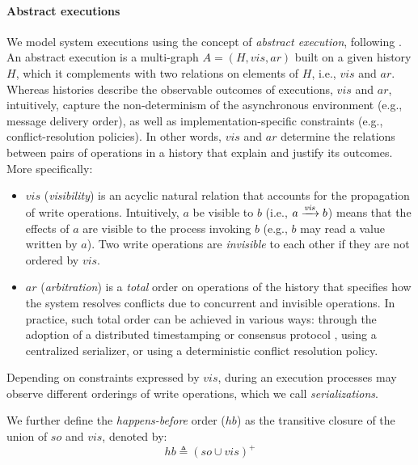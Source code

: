 \documentclass[letter, 11pt]{article}
\newcommand{\citeN}{\citet}
\renewcommand{\cite}{\citep}
\newcommand{\A}{\ensuremath{A}}
\begin{document}
\paragraph{Abstract executions} We model system executions using the concept of 
\emph{abstract execution}, following \citeN{Burckhardt:14}. An abstract execution is a multi-graph $\A = (H,vis,ar)$ built on a given history $H$, which it complements with two relations on elements of $H$, i.e., $vis$ and $ar$. Whereas histories describe the observable outcomes of executions,
$vis$ and $ar$, intuitively, capture the non-determinism of the asynchronous environment (e.g., message delivery order), as well as implementation-specific constraints (e.g., conflict-resolution policies).
In other words, $vis$ and $ar$ determine the relations between pairs of operations in a 
history that explain and justify its outcomes. 
More specifically:
\begin{itemize}
\item $vis$ (\emph{visibility}) is an acyclic natural relation that accounts for the propagation of write operations. 
Intuitively, $a$ be visible to $b$ (i.e., $a \xrightarrow[]{\text{\textit{vis}}} b$) means that the effects of $a$ are visible to the process invoking $b$ (e.g., $b$ may read a value written by $a$). 
Two write operations are \emph{invisible} to each other if they are not ordered by $vis$.

\item $ar$ (\emph{arbitration}) is a \emph{total} order on operations of the history that specifies 
how  the system resolves conflicts due to concurrent and invisible operations. In practice, such total order can be achieved in various ways: through the 
adoption of a distributed timestamping \cite{Lamport:78} or consensus protocol \cite{Birman.ea:91,Hadzilacos.Toueg:94,Lamport:01}, 
using a centralized serializer, or 
using a deterministic conflict resolution policy.
\end{itemize}

Depending on constraints expressed by $vis$,
during an execution processes may observe different orderings of write operations, which we call \emph{serializations}. 

We further define the \emph{happens-before} order ($hb$) as the transitive closure 
of the union of $so$ and $vis$, denoted by: 
\begin{equation}
\label{eq:hb}
hb \triangleq (so \cup vis)^+
\end{equation}
\end{document}
